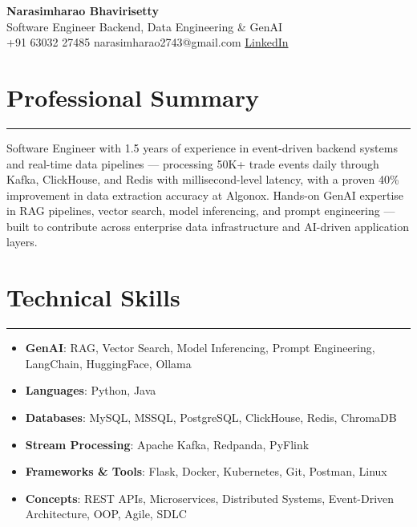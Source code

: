 \documentclass[10pt]{article}
\begin{document}
\begin{center}
  {\huge\textbf{Narasimharao Bhavirisetty}}\\[3pt]
  Software Engineer \textbullet{} Backend, Data Engineering \& GenAI \\[3pt]
  +91 63032 27485 \textbullet{} narasimharao2743@gmail.com \textbullet{} \href{https://linkedin.com/in/narasimharao-bhavirisetty-0526891b0}{LinkedIn}
\end{center}

\vspace{4pt}

\section*{Professional Summary}
\vspace{1pt}\hrule\vspace{4pt}
Software Engineer with 1.5 years of experience in event-driven backend systems and real-time data pipelines — processing 50K+ trade events daily through Kafka, ClickHouse, and Redis with millisecond-level latency, with a proven 40\% improvement in data extraction accuracy at Algonox. Hands-on GenAI expertise in RAG pipelines, vector search, model inferencing, and prompt engineering — built to contribute across enterprise data infrastructure and AI-driven application layers.

\section*{Technical Skills}
\vspace{1pt}\hrule\vspace{4pt}
\begin{itemize}
  \item \textbf{GenAI}: RAG, Vector Search, Model Inferencing, Prompt Engineering, LangChain, HuggingFace, Ollama
  \item \textbf{Languages}: Python, Java
  \item \textbf{Databases}: MySQL, MSSQL, PostgreSQL, ClickHouse, Redis, ChromaDB
  \item \textbf{Stream Processing}: Apache Kafka, Redpanda, PyFlink
  \item \textbf{Frameworks \& Tools}: Flask, Docker, Kubernetes, Git, Postman, Linux
  \item \textbf{Concepts}: REST APIs, Microservices, Distributed Systems, Event-Driven Architecture, OOP, Agile, SDLC
\end{itemize}
\end{document}
